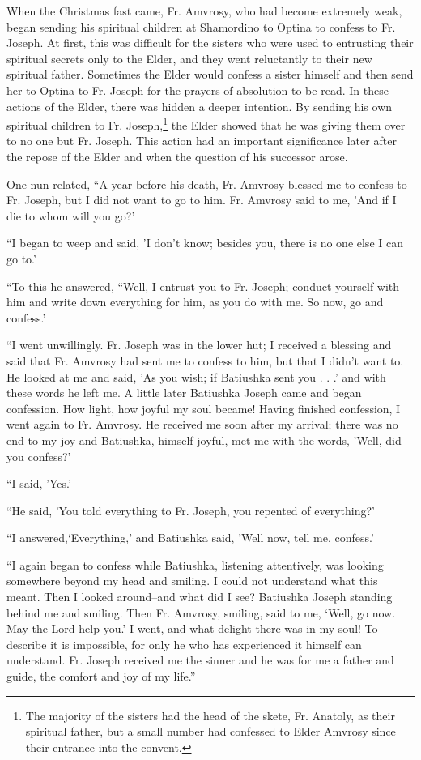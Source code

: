When the Christmas fast came, Fr. Amvrosy, who had become extremely weak, began sending his spiritual children at Shamordino to Optina to confess to Fr. Joseph. At first, this was difficult for the sisters who were used to entrusting their spiritual secrets only to the Elder, and they went reluctantly to their new spiritual father. Sometimes the Elder would confess a sister himself and then send her to Optina to Fr. Joseph for the prayers of absolution to be read. In these actions of the Elder, there was hidden a deeper intention. By sending his own spiritual children to Fr. Joseph,\footnote{The majority of the sisters had the head of the skete, Fr. Anatoly, as their spiritual father, but a small number had confessed to Elder Amvrosy since their entrance into the convent.} the Elder showed that he was giving them over to no one but Fr. Joseph. This action had an important significance later after the repose of the Elder and when the question of his successor arose.

One nun related, “A year before his death, Fr. Amvrosy blessed me to confess to Fr. Joseph, but I did not want to go to him. Fr. Amvrosy said to me, 'And if I die to whom will you go?'

“I began to weep and said, 'I don't know; besides you, there is no one else I can go to.'

“To this he answered, “Well, I entrust you to Fr. Joseph; conduct yourself with him and write down everything for him, as you do with me. So now, go and confess.'

“I went unwillingly. Fr. Joseph was in the lower hut; I received a blessing and said that Fr. Amvrosy had sent me to confess to him, but that I didn't want to. He looked at me and said, 'As you wish; if Batiushka sent you . . .' and with these words he left me. A little later Batiushka Joseph came and began confession. How light, how joyful my soul became! Having finished confession, I went again to Fr. Amvrosy. He received me soon after my arrival; there was no end to my joy and Batiushka, himself joyful, met me with the words, 'Well, did you confess?'

“I said, 'Yes.'

“He said, 'You told everything to Fr. Joseph, you repented of everything?'

“I answered,‘Everything,' and Batiushka said, 'Well now, tell me, confess.'

“I again began to confess while Batiushka, listening attentively, was looking somewhere beyond my head and smiling. I could not understand what this meant. Then I looked around--and what did I see? Batiushka Joseph standing behind me and smiling. Then Fr. Amvrosy, smiling, said to me, ‘Well, go now. May the Lord help you.' I went, and what delight there was in my soul! To describe it is impossible, for only he who has experienced it himself can understand. Fr. Joseph received me the sinner and he was for me a father and guide, the comfort and joy of my life.”

